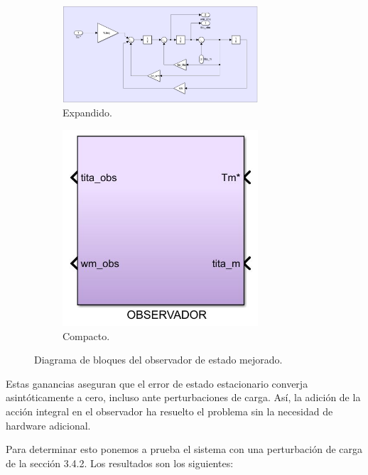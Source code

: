 \documentclass{article}
\begin{document}
\begin{figure}[H]
    \begin{subfigure}[b]{0.75\textwidth}
        \centering
        \includegraphics[width=0.8\textwidth]{observador_mejorado.jpg}
        \caption{Expandido.}
    \end{subfigure}
    \begin{subfigure}[b]{0.24\textwidth}
        \centering
        \includegraphics[width=0.8\textwidth]{observador_reducido_compacto.jpg}
        \caption{Compacto.}
    \end{subfigure}
    \caption{Diagrama de bloques del observador de estado mejorado.}
\end{figure}

Estas ganancias aseguran que el error de estado estacionario converja asintóticamente a cero, 
incluso ante perturbaciones de carga. Así, la adición de la acción integral en el observador ha 
resuelto el problema sin la necesidad de hardware adicional.

Para determinar esto ponemos a prueba el sistema con una perturbación de carga de la sección
3.4.2. Los resultados son los siguientes:
\end{document}
